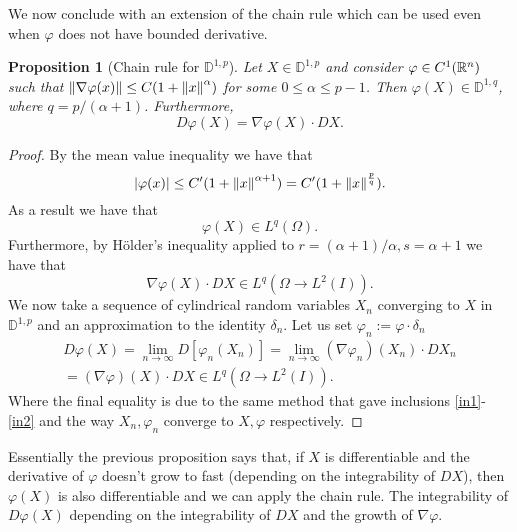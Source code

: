 \documentclass[12pt]{article}
\newtheorem{proposition}{Proposition}
\begin{document}
We now conclude with an extension of the chain rule which can be used even when $\varphi$ does not have bounded derivative.
\begin{proposition}[Chain rule for $\mathbb{D}^{1,p}$]
	Let $X\in \mathbb{D}^{1,p}$ and consider $\varphi\in C^1({\mathbb R}^n)$ such that $\norm{\nabla\varphi(x)}\leq C(1+\norm{x}^\alpha)$ for some $0\leq \alpha\leq p-1$. Then
	$\varphi(X)\in \mathbb{D}^{1,q}$, where $q=p/(\alpha+1)$. Furthermore,
	\begin{equation*}
		D\varphi(X)=\nabla \varphi(X) \cdot D X.
	\end{equation*}
\end{proposition}
\begin{proof}
	By the mean value inequality we have that
	\begin{equation*}
		\abs{\varphi(x)}\leq C'(1+\norm{x}^{\alpha+1})=C'(1+\norm{x}^{\frac{p}{q}}).
	\end{equation*}
	As a result we have that
	\begin{equation}\label{in1}
		\varphi(X) \in L^q(\Omega).
	\end{equation}
	Furthermore, by Hölder's inequality applied to  $r=(\alpha+1) / \alpha, s=\alpha+1$ we have that
	\begin{equation}\label{in2}
		\nabla \varphi(X) \cdot D X \in L^q(\Omega\to L^2(I)).
	\end{equation}
	We now take a sequence of cylindrical random variables $X_n$ converging to  $X$ in $\mathbb{D}^{1,p}$ and an approximation to the identity  $\delta_n$. Let us set $\varphi_n:=\varphi \cdot \delta_n$
	\begin{multline*}
		D \varphi(X)=\lim_{n \to \infty} D [\varphi_n(X_n)]=\lim_{n \to \infty} (\nabla \varphi_n)(X_n)\cdot DX_n\\=	(\nabla \varphi)(X)\cdot DX \in L^q(\Omega\to L^2(I)).
	\end{multline*}
	Where the final equality is due to the same method that gave inclusions \eqref{in1}-\eqref{in2} and the way $X_n,\varphi_n$ converge to $X,\varphi$ respectively.
\end{proof}
Essentially the previous proposition says that, if $X$ is differentiable and the derivative of $\varphi$ doesn't grow to fast (depending on the integrability of $DX$), then $\varphi(X)$ is also differentiable and we can apply the chain rule. The integrability of $D\varphi(X)$ depending on the integrability of $DX$ and the growth of $\nabla \varphi$.
\end{document}
